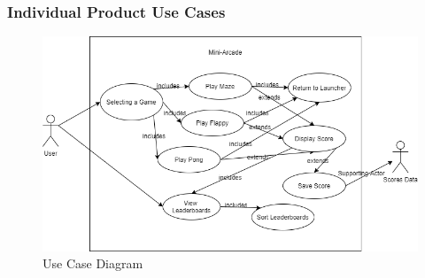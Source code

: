 \documentclass[12pt, titlepage]{article}
\begin{document}
\subsubsection{Individual Product Use Cases}

\begin{figure}[H] %
    \centering
    \includegraphics[width=6in]{Images/UseCaseDiagram.png} 
    \caption{Use Case Diagram}
    \label{fig:example}
 \end{figure}
 
\end{document}
